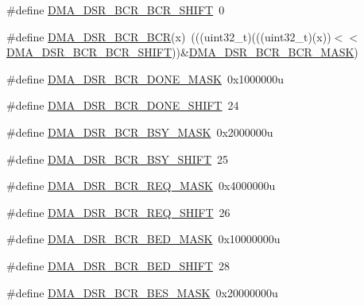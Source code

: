 \begin{DoxyCompactItemize}
\item 
\#define \hyperlink{group___d_m_a___register___masks_ga7eb36602370f4118640f57d51913ff89}{D\+M\+A\+\_\+\+D\+S\+R\+\_\+\+B\+C\+R\+\_\+\+B\+C\+R\+\_\+\+S\+H\+I\+FT}~0
\item 
\#define \hyperlink{group___d_m_a___register___masks_gaa1f47d8804ae4a1f26265869b29a3a36}{D\+M\+A\+\_\+\+D\+S\+R\+\_\+\+B\+C\+R\+\_\+\+B\+CR}(x)~(((uint32\+\_\+t)(((uint32\+\_\+t)(x))$<$$<$\hyperlink{group___d_m_a___register___masks_ga7eb36602370f4118640f57d51913ff89}{D\+M\+A\+\_\+\+D\+S\+R\+\_\+\+B\+C\+R\+\_\+\+B\+C\+R\+\_\+\+S\+H\+I\+FT}))\&\hyperlink{group___d_m_a___register___masks_ga51f1a407dbca889f0b21bb1eeaa1c5d0}{D\+M\+A\+\_\+\+D\+S\+R\+\_\+\+B\+C\+R\+\_\+\+B\+C\+R\+\_\+\+M\+A\+SK})
\item 
\#define \hyperlink{group___d_m_a___register___masks_gaaa733d9c65fb074a9e836b8abaa8173f}{D\+M\+A\+\_\+\+D\+S\+R\+\_\+\+B\+C\+R\+\_\+\+D\+O\+N\+E\+\_\+\+M\+A\+SK}~0x1000000u
\item 
\#define \hyperlink{group___d_m_a___register___masks_gaa9063734a56a62385b42210acedc3144}{D\+M\+A\+\_\+\+D\+S\+R\+\_\+\+B\+C\+R\+\_\+\+D\+O\+N\+E\+\_\+\+S\+H\+I\+FT}~24
\item 
\#define \hyperlink{group___d_m_a___register___masks_ga517e206a9b5422e95b875d13973d6888}{D\+M\+A\+\_\+\+D\+S\+R\+\_\+\+B\+C\+R\+\_\+\+B\+S\+Y\+\_\+\+M\+A\+SK}~0x2000000u
\item 
\#define \hyperlink{group___d_m_a___register___masks_gaa9f53140b5fb6fbbf7cae9d4190bac47}{D\+M\+A\+\_\+\+D\+S\+R\+\_\+\+B\+C\+R\+\_\+\+B\+S\+Y\+\_\+\+S\+H\+I\+FT}~25
\item 
\#define \hyperlink{group___d_m_a___register___masks_ga24c6d2ae6aa7b472b69e357ef0729902}{D\+M\+A\+\_\+\+D\+S\+R\+\_\+\+B\+C\+R\+\_\+\+R\+E\+Q\+\_\+\+M\+A\+SK}~0x4000000u
\item 
\#define \hyperlink{group___d_m_a___register___masks_gae04420d59dbb4e54831ac0ddb67d6f74}{D\+M\+A\+\_\+\+D\+S\+R\+\_\+\+B\+C\+R\+\_\+\+R\+E\+Q\+\_\+\+S\+H\+I\+FT}~26
\item 
\#define \hyperlink{group___d_m_a___register___masks_ga958e11f5f7fed3d90bdb94d1c1ff4179}{D\+M\+A\+\_\+\+D\+S\+R\+\_\+\+B\+C\+R\+\_\+\+B\+E\+D\+\_\+\+M\+A\+SK}~0x10000000u
\item 
\#define \hyperlink{group___d_m_a___register___masks_ga7219c99c1ea8c8a5c029fc998753606b}{D\+M\+A\+\_\+\+D\+S\+R\+\_\+\+B\+C\+R\+\_\+\+B\+E\+D\+\_\+\+S\+H\+I\+FT}~28
\item 
\#define \hyperlink{group___d_m_a___register___masks_ga64861328d89d08de32a89fb60eee1f78}{D\+M\+A\+\_\+\+D\+S\+R\+\_\+\+B\+C\+R\+\_\+\+B\+E\+S\+\_\+\+M\+A\+SK}~0x20000000u
$$
\end{DoxyCompactItemize}
